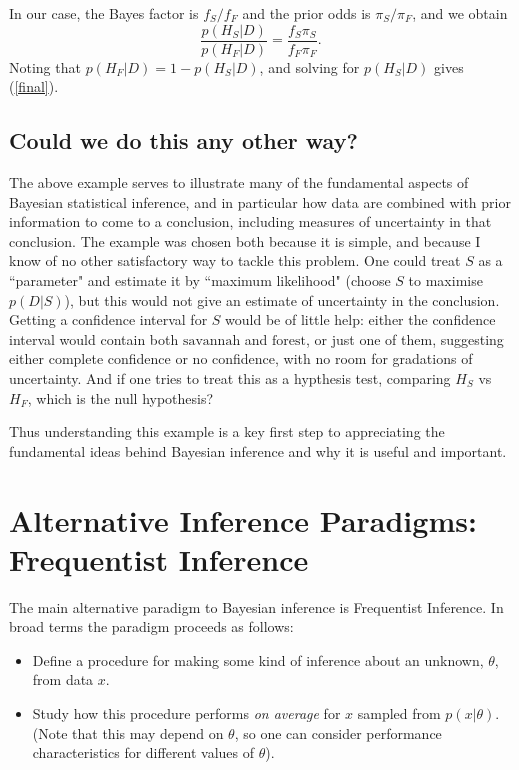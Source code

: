 \documentclass[times,11pt]{article}
\def\s{\mbox{savannah}}
\def\f{\mbox{forest}}
\def\ffA{f_F}
\def\fsA{f_S}
\def\pif{\pi_F}
\def\pis{\pi_S}
\def\Hf{H_F}
\def\Hs{H_S}
\begin{document}
In our case, the Bayes factor is $\fsA/\ffA$ and the prior odds is $\pis/\pif$, and we obtain
\begin{equation}
\frac{p(\Hs | D)}{p(\Hf | D)} = \frac{\fsA\pis}{\ffA \pif}.
\end{equation}
Noting that $p(\Hf|D) = 1-p(\Hs|D)$, and solving for $p(\Hs |D)$ gives (\ref{final}).

\subsection*{Could we do this any other way?}

The above example serves to illustrate many of the fundamental aspects of Bayesian statistical inference, and in particular how data are combined with prior information to come to a conclusion, including measures of uncertainty in that conclusion. The example was chosen both because it is simple, and because
I know of no other satisfactory way to tackle this problem. One could treat $S$ as a ``parameter" and estimate it by ``maximum likelihood" (choose $S$ to maximise $p(D|S)$), but this would not give an estimate of uncertainty in the conclusion. Getting a confidence interval for $S$ would be of little help: either the confidence interval would contain both $\s$ and $\f$, or just one of them, suggesting either complete confidence or no confidence, with no room for gradations of uncertainty. And if one tries to treat this as a hypthesis test, comparing $\Hs$ vs $\Hf$, which is the null hypothesis? 

Thus understanding this example is a key first step to appreciating
the fundamental ideas behind Bayesian inference and why it is useful and important. 


\section*{Alternative Inference Paradigms: Frequentist Inference}

The main alternative paradigm to Bayesian inference is Frequentist Inference.
In broad terms the paradigm proceeds as follows:
\begin{itemize}
\item Define a procedure for making some kind of inference about an unknown, $\theta$, from data $x$.
\item Study how this procedure performs {\it on average} for $x$ sampled from $p(x|\theta)$. (Note that this may depend on $\theta$, so one can consider performance characteristics for different values of $\theta$).
\end{itemize}
\end{document}
